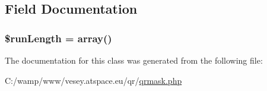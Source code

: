 \subsection{Field Documentation}
\hypertarget{class_q_rmask_a392928695314bbd5f64617e6e7d6fec9}{
\subsubsection[{\$run\-Length}]{\setlength{\rightskip}{0pt plus 5cm}\$run\-Length = array()}}\label{class_q_rmask_a392928695314bbd5f64617e6e7d6fec9}


The documentation for this class was generated from the following file\-:\begin{DoxyCompactItemize}
\item 
C\-:/wamp/www/vesey.\-atspace.\-eu/qr/\hyperlink{qrmask_8php}{qrmask.\-php}\end{DoxyCompactItemize}
